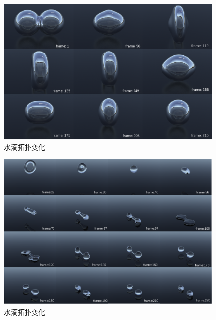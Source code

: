 \begin{figure}[htbp]
    \centering
    \includegraphics[scale=0.56]{./images/DoubleSphere.png}
    \caption[水滴拓扑变化实验]{水滴拓扑变化}
    \label{fig: double sphere experience}
\end{figure}

\begin{figure}[htbp]
    \centering
    \includegraphics[scale=0.56]{./images/TorusSplit.png}
    \caption[水滴拓扑变化实验]{水滴拓扑变化}
    \label{fig: torus split experience}
\end{figure}

